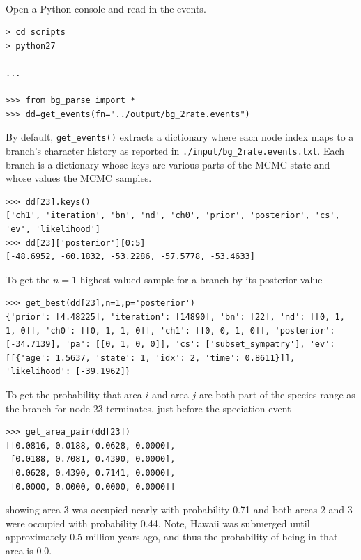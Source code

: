 \noindent \\ \impmark  Open a Python console and read in the events.

\begin{snugshade}
\begin{lstlisting}
> cd scripts
> python27

...

>>> from bg_parse import *
>>> dd=get_events(fn="../output/bg_2rate.events")
\end{lstlisting}
\end{snugshade}

By default, {\tt get\_events()} extracts a dictionary where each node index maps to a branch's character history as reported in {\tt ./input/bg\_2rate.events.txt}. 
Each branch is a dictionary whose keys are various parts of the MCMC state and whose values the MCMC samples.
\begin{snugshade}
\begin{lstlisting}
>>> dd[23].keys()
['ch1', 'iteration', 'bn', 'nd', 'ch0', 'prior', 'posterior', 'cs', 'ev', 'likelihood']
>>> dd[23]['posterior'][0:5]
[-48.6952, -60.1832, -53.2286, -57.5778, -53.4633]
\end{lstlisting}
\end{snugshade}

To get the $n=1$ highest-valued sample for a branch by its posterior value
\begin{snugshade}
\begin{lstlisting}
>>> get_best(dd[23],n=1,p='posterior')
{'prior': [4.48225], 'iteration': [14890], 'bn': [22], 'nd': [[0, 1, 1, 0]], 'ch0': [[0, 1, 1, 0]], 'ch1': [[0, 0, 1, 0]], 'posterior': [-34.7139], 'pa': [[0, 1, 0, 0]], 'cs': ['subset_sympatry'], 'ev': [[{'age': 1.5637, 'state': 1, 'idx': 2, 'time': 0.8611}]], 'likelihood': [-39.1962]}
\end{lstlisting}
\end{snugshade}

To get the probability that area $i$ and area $j$ are both part of the species range as the branch for node 23 terminates, just before the speciation event
\begin{snugshade}
\begin{lstlisting}
>>> get_area_pair(dd[23])
[[0.0816, 0.0188, 0.0628, 0.0000],
 [0.0188, 0.7081, 0.4390, 0.0000],
 [0.0628, 0.4390, 0.7141, 0.0000],
 [0.0000, 0.0000, 0.0000, 0.0000]]
\end{lstlisting}
\end{snugshade}
showing area 3 was occupied nearly with probability 0.71 and both areas 2 and 3 were occupied with probability 0.44.
Note, Hawaii was submerged until approximately 0.5 million years ago, and thus the probability of being in that area is 0.0.

